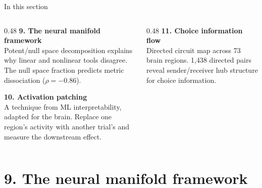 \documentclass[aspectratio=169,11pt]{beamer}
\begin{document}
\begin{frame}{In this section}
\begin{columns}[T]
\begin{column}{0.48\textwidth}
\textbf{9. The neural manifold framework}\\[0.2em]
{\small Potent/null space decomposition explains why linear and nonlinear tools disagree. The null space fraction predicts metric dissociation ($\rho = -0.86$).}

\vspace{0.6em}
\textbf{10. Activation patching}\\[0.2em]
{\small A technique from ML interpretability, adapted for the brain. Replace one region's activity with another trial's and measure the downstream effect.}
\end{column}
\begin{column}{0.48\textwidth}
\textbf{11. Choice information flow}\\[0.2em]
{\small Directed circuit map across 73 brain regions. 1,438 directed pairs reveal sender/receiver hub structure for choice information.}
\end{column}
\end{columns}
\end{frame}

\section{9. The neural manifold framework}
\end{document}
